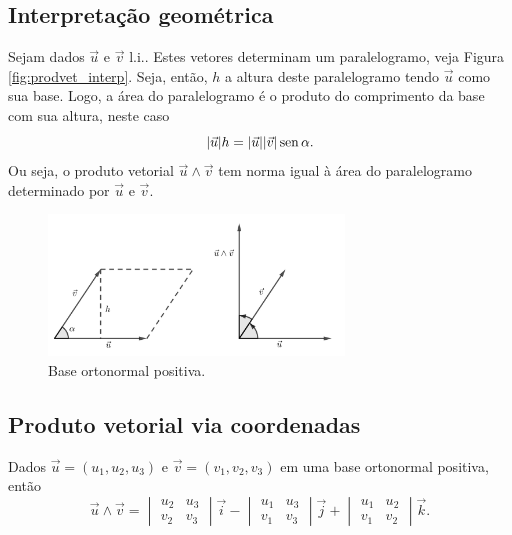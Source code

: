 \subsection{Interpretação geométrica}

Sejam dados $\vec{u}$ e $\vec{v}$ l.i.. Estes vetores determinam um paralelogramo, veja Figura \ref{fig:prodvet_interp}. Seja, então, $h$ a altura deste paralelogramo tendo $\vec{u}$ como sua base. Logo, a área do paralelogramo é o produto do comprimento da base com sua altura, neste caso
\begin{equation}
  |\vec{u}|h = |\vec{u}||\vec{v}|\operatorname{sen}\alpha.
\end{equation}
Ou seja, o produto vetorial $\vec{u}\land\vec{v}$ tem norma igual à área do paralelogramo determinado por $\vec{u}$ e $\vec{v}$.

\begin{figure}[H]
  \centering
  \includegraphics[width=0.7\textwidth]{./cap_prodvet/dados/fig_prodvet_interp/fig_prodvet_interp}
  \caption{Base ortonormal positiva.}
  \label{fig:base_pos}
\end{figure}

\subsection{Produto vetorial via coordenadas}\label{cap_prodvet_sec_coord}

Dados $\vec{u} = (u_1,u_2,u_3)$ e $\vec{v} = (v_1,v_2,v_3)$ em uma base ortonormal positiva, então
\begin{equation}
  \vec{u}\land\vec{v} =
  \begin{vmatrix}
    u_2 & u_3\\
    v_2 & v_3
  \end{vmatrix}\vec{i} -
  \begin{vmatrix}
    u_1 & u_3\\
    v_1 & v_3
  \end{vmatrix}\vec{j} +
  \begin{vmatrix}
    u_1 & u_2 \\
    v_1 & v_2
  \end{vmatrix}\vec{k}.
\end{equation}

